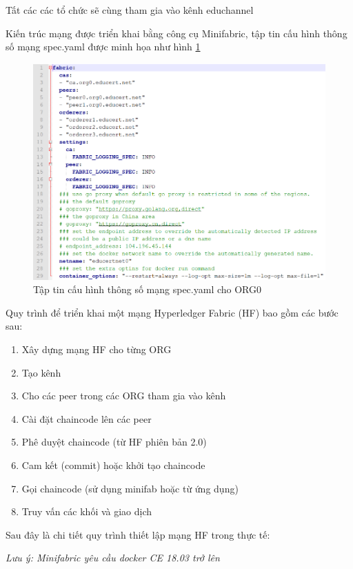 Tất các các tổ chức sẽ cùng tham gia vào kênh educhannel

Kiến trúc mạng được triển khai bằng công cụ Minifabric, tập tin cấu hình thông số mạng spec.yaml được minh họa như hình
\ref{fig:minifab_diagram}
\begin{figure}[H]
\centering
\includegraphics[width=.8\linewidth]{img/minifab.png}
\caption{Tập tin cấu hình thông số mạng spec.yaml cho ORG0}
\label{fig:minifab_diagram}
\end{figure}


Quy trình để triển khai một mạng Hyperledger Fabric (HF) bao gồm các bước sau:
\begin{enumerate}
    \item Xây dựng mạng HF cho từng ORG
    \item Tạo kênh
    \item Cho các peer trong các ORG tham gia vào kênh
    \item Cài đặt chaincode lên các peer
    \item Phê duyệt chaincode (từ HF phiên bản 2.0)
    \item Cam kết (commit) hoặc khởi tạo chaincode
    \item Gọi chaincode (sử dụng minifab hoặc từ ứng dụng)
    \item Truy vấn các khối và giao dịch
\end{enumerate}

Sau đây là chi tiết quy trình thiết lập mạng HF trong thực tế:

\emph{Lưu ý: Minifabric yêu cầu docker CE 18.03 trở lên}

